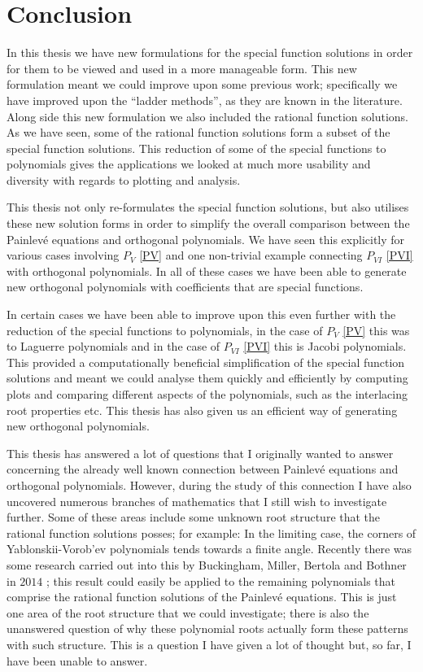 \documentclass[12pt]{article}
\def\P{Painlev\'e }
\numberwithin{figure}{section}
\numberwithin{equation}{section}
\numberwithin{table}{section}
\begin{document}
\section{Conclusion}
In this thesis we have new formulations for the special function solutions in order for them to be viewed and used in a more manageable form. This new formulation meant we could improve upon some previous work; specifically we have improved upon the ``ladder methods'', as they are known in the literature. Along side this new formulation we also included the rational function solutions. As we have seen, some of the rational function solutions form a subset of the special function solutions. This reduction of some of the special functions to polynomials gives the applications we looked at much more usability and diversity with regards to plotting and analysis.

This thesis not only re-formulates the special function solutions, but also utilises these new solution forms in order to simplify the overall comparison between the \P equations and orthogonal polynomials. We have seen this explicitly for various cases involving $P_V$ \eqref{PV} and one non-trivial example connecting $P_{VI}$ \eqref{PVI} with orthogonal polynomials. In all of these cases we have been able to generate new orthogonal polynomials with coefficients that are special functions.

In certain cases we have been able to improve upon this even further with the reduction of the special functions to polynomials, in the case of $P_V$ \eqref{PV} this was to Laguerre polynomials and in the case of $P_{VI}$ \eqref{PVI} this is Jacobi polynomials. This provided a computationally beneficial simplification of the special function solutions and meant we could analyse them quickly and efficiently by computing plots and comparing different aspects of the polynomials, such as the interlacing root properties etc. This thesis has also given us an efficient way of generating new orthogonal polynomials.

This thesis has answered a lot of questions that I originally wanted to answer concerning the already well known connection between \P equations and orthogonal polynomials. However, during the study of this connection I have also uncovered numerous branches of mathematics that I still wish to investigate further. Some of these areas include some unknown root structure that the rational function solutions posses; for example: In the limiting case, the corners of Yablonskii-Vorob'ev polynomials tends towards a finite angle. Recently there was some research carried out into this by Buckingham, Miller, Bertola and Bothner in $2014$ \cite{P:Intmath,P:27:2578,P:28:1596}; this result could easily be applied to the remaining polynomials that comprise the rational function solutions of the \P equations. This is just one area of the root structure that we could investigate; there is also the unanswered question of why these polynomial roots actually form these patterns with such structure. This is a question I have given a lot of thought but, so far, I have been unable to answer.
\end{document}
